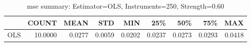 \begin{table}[ht]
\centering
\caption{mse summary: Estimator=OLS, Instruments=250, Strength=0.60}
\begin{tabular}{lrrrrrrrr}
\toprule
 & COUNT & MEAN & STD & MIN & 25\% & 50\% & 75\% & MAX \\
\midrule
OLS & 10.0000 & 0.0277 & 0.0059 & 0.0202 & 0.0237 & 0.0273 & 0.0293 & 0.0418 \\
\bottomrule
\end{tabular}
\end{table}
